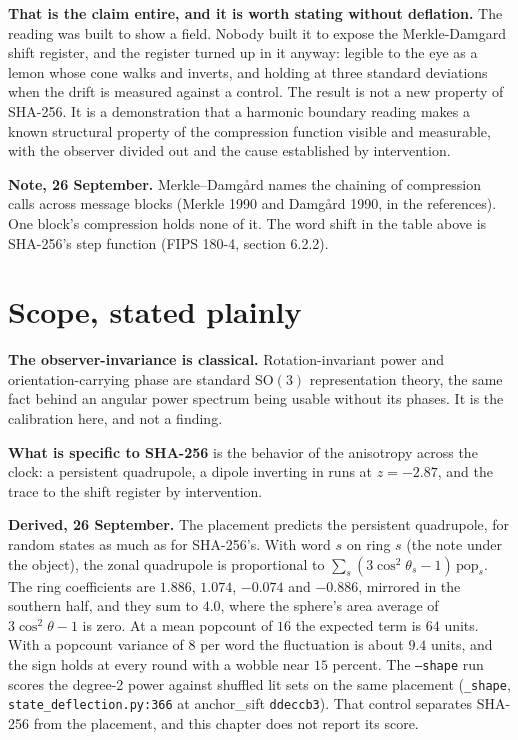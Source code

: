 \textbf{That is the claim entire, and it is worth stating without deflation.} The reading was built to show a field. Nobody built it to expose the Merkle-Damgard shift register, and the register turned up in it anyway: legible to the eye as a lemon whose cone walks and inverts, and holding at three standard deviations when the drift is measured against a control. The result is not a new property of SHA-256. It is a demonstration that a harmonic boundary reading makes a known structural property of the compression function visible and measurable, with the observer divided out and the cause established by intervention.

\textbf{Note, 26 September.} Merkle--Damg\aa{}rd names the chaining of compression calls across message blocks (Merkle 1990 and Damg\aa{}rd 1990, in the references). One block's compression holds none of it. The word shift in the table above is SHA-256's step function (FIPS 180-4, section 6.2.2).

\section{Scope, stated plainly}

\textbf{The observer-invariance is classical.} Rotation-invariant power and orientation-carrying phase are standard \(\mathrm{SO}(3)\) representation theory, the same fact behind an angular power spectrum being usable without its phases. It is the calibration here, and not a finding.

\textbf{What is specific to SHA-256} is the behavior of the anisotropy across the clock: a persistent quadrupole, a dipole inverting in runs at \(z = -2.87\), and the trace to the shift register by intervention.

\textbf{Derived, 26 September.} The placement predicts the persistent quadrupole, for random states as much as for SHA-256's. With word \(s\) on ring \(s\) (the note under the object), the zonal quadrupole is proportional to \(\sum_s (3\cos^2\theta_s - 1)\,\mathrm{pop}_s\). The ring coefficients are \(1.886\), \(1.074\), \(-0.074\) and \(-0.886\), mirrored in the southern half, and they sum to \(4.0\), where the sphere's area average of \(3\cos^2\theta - 1\) is zero. At a mean popcount of \(16\) the expected term is \(64\) units. With a popcount variance of \(8\) per word the fluctuation is about \(9.4\) units, and the sign holds at every round with a wobble near \(15\) percent. The \texttt{--shape} run scores the degree-2 power against shuffled lit sets on the same placement (\texttt{\_shape}, \texttt{state\_deflection.py:366} at anchor\_sift \texttt{ddeccb3}). That control separates SHA-256 from the placement, and this chapter does not report its score.

